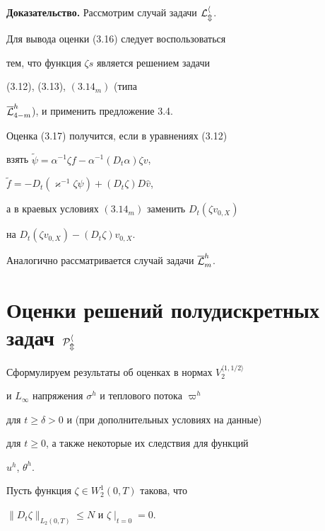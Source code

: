 {\bf Доказательство.} Рассмотрим случай задачи $\cal L_m^h$.


Для вывода оценки (3.16) следует воспользоваться


тем, что функция $\zeta s$ является решением задачи


(3.12), (3.13), $(3.14_m)$ (типа


$\overline{\cal L}_{4-m}^h$), и применить предложение 3.4.


Оценка (3.17) получится, если в уравнениях (3.12)


взять $\widetilde\psi=\alpha^{-1}\zeta f-\alpha^{-1}(D_t\alpha)\zeta v$,


$\widetilde f=-D_t(\varkappa^{-1}\zeta\psi)+(D_t\zeta)D\widehat v$,


а в краевых условиях $(3.14_m)$ заменить $D_t(\zeta v_{0,X})$


на $D_t(\zeta v_{0,X})-(D_t\zeta)v_{0,X}$.





Аналогично рассматривается случай задачи $\overline{\cal L}_m^h$.





\section{Оценки решений полудискретных задач $\cal P^h_m$}





Сформулируем результаты об оценках в нормах $V_2^{\langle 1,1/2\rangle}$


и $L_\infty$ напряжения $\sigma^h$ и теплового потока $\varpi^h$


для $t\ge\delta>0$ и (при дополнительных условиях на данные)


для $t\ge 0$, а также некоторые их следствия для функций


$u^h$, $\theta^h$.





Пусть функция $\zeta\in W^1_2(0,T)$ такова, что


$\|D_t\zeta\|_{L_2(0,T)}\le N$ и $\zeta\mid_{t=0}=0$.





